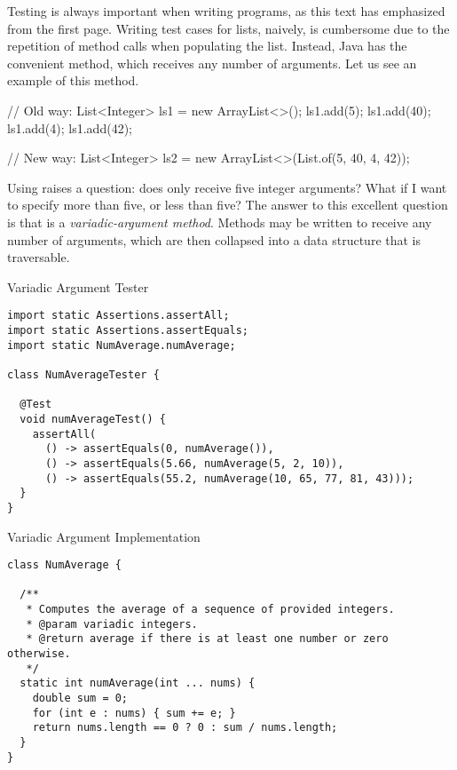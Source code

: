 Testing is always important when writing programs, as this text has emphasized from the first page. Writing test cases for lists, naively, is cumbersome due to the repetition of  method calls when populating the list. Instead, Java has the convenient  method, which receives any number of arguments. Let us see an example of this method.

\begin{verbnobox}[\footnotesize]
// Old way:
List<Integer> ls1 = new ArrayList<>();
ls1.add(5);
ls1.add(40);
ls1.add(4);
ls1.add(42);

// New way:
List<Integer> ls2 = new ArrayList<>(List.of(5, 40, 4, 42));
\end{verbnobox}
Using  raises a question: does  only receive five integer arguments? What if I want to specify more than five, or less than five? The answer to this excellent question is that  is a \textit{variadic-argument method}. Methods may be written to receive any number of arguments, which are then collapsed into a data structure that is traversable.


\begin{cl}[]{Variadic Argument  Tester}
\begin{lstlisting}[language=MyJava]
import static Assertions.assertAll;
import static Assertions.assertEquals;
import static NumAverage.numAverage;

class NumAverageTester {

  @Test
  void numAverageTest() {
    assertAll(
      () -> assertEquals(0, numAverage()),
      () -> assertEquals(5.66, numAverage(5, 2, 10)),
      () -> assertEquals(55.2, numAverage(10, 65, 77, 81, 43)));
  }
}
\end{lstlisting}
\end{cl}

\begin{cl}[]{Variadic Argument  Implementation}
\begin{lstlisting}[language=MyJava]
class NumAverage {

  /**
   * Computes the average of a sequence of provided integers.
   * @param variadic integers.
   * @return average if there is at least one number or zero otherwise.
   */
  static int numAverage(int ... nums) {
    double sum = 0;
    for (int e : nums) { sum += e; }
    return nums.length == 0 ? 0 : sum / nums.length;
  }
}
\end{lstlisting}
\end{cl}

